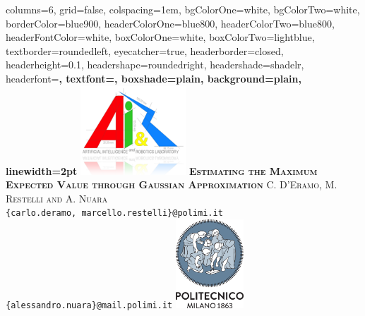 \documentclass[portrait,a0paper,fontscale=0.312]{baposter}
\begin{document}
\begin{poster}%
  {
  columns=6,
  grid=false,
  colspacing=1em,
  bgColorOne=white,
  bgColorTwo=white,
  borderColor=blue900,
  headerColorOne=blue800,
  headerColorTwo=blue800,
  headerFontColor=white,
  boxColorOne=white,
  boxColorTwo=lightblue,
  textborder=roundedleft,
  eyecatcher=true,
  headerborder=closed,
  headerheight=0.1\textheight,
  headershape=roundedright,
  headershade=shadelr,
  headerfont=\Large\bf\textsc, %
  textfont={\setlength{\parindent}{1.5em}},
  boxshade=plain,
  background=plain,
  linewidth=2pt
  }
  {\includegraphics[height=9em]{./pics/airlab_logo_reflect.png}} 
  {\bf\textsc{Estimating the Maximum Expected Value through Gaussian Approximation}\vspace{0.1em}}
  {\textsc{C. D'Eramo, M. Restelli and A. Nuara}\\ {\normalsize \texttt{\{carlo.deramo, marcello.restelli\}@polimi.it}}\\ {\normalsize \texttt{\{alessandro.nuara\}@mail.polimi.it}}}
  {%
    \includegraphics[height=9.0em]{./pics/polilogo/logoPoliBlue_poster.png}
  }


\end{poster}
\end{document}
